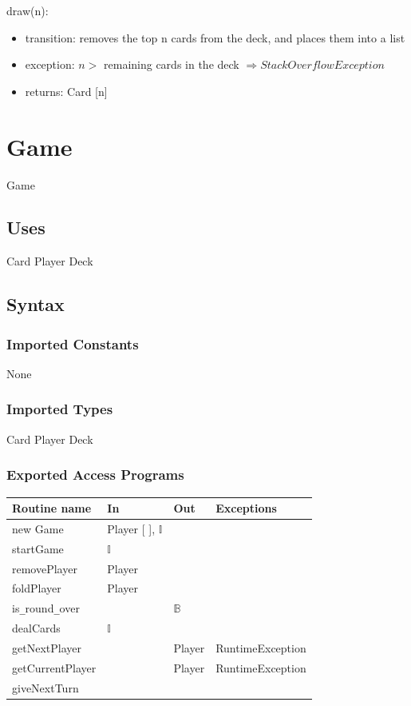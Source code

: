 \documentclass[12pt, titlepage]{article}
\begin{document}
\noindent draw(n):
\begin{itemize}
\item transition: removes the top n cards from the deck, and places them into a list 
\item exception: $n >$ remaining cards in the deck $\Longrightarrow StackOverflowException$
\item returns: Card [n] 
\end{itemize}

\section*{Game}

Game

\subsection* {Uses}

Card
Player
Deck

\subsection* {Syntax}

\subsubsection* {Imported Constants}

None

\subsubsection* {Imported Types}

Card
Player 
Deck

\subsubsection* {Exported Access Programs}

\begin{tabular}{| l | l | l | p{5cm} |}
\hline
\textbf{Routine name} & \textbf{In} & \textbf{Out} & \textbf{Exceptions}\\
\hline
new Game & Player [ ], $\mathbb{I}$ & &\\
\hline
startGame & $\mathbb{I}$ & &\\
\hline 
removePlayer & Player & &\\
\hline 
foldPlayer & Player & &\\
\hline 
is\verb|_|round\verb|_|over & & $\mathbb{B}$ &\\
\hline 
dealCards & $\mathbb{I}$ & &\\
\hline
getNextPlayer & & Player & RuntimeException\\ 
\hline 
getCurrentPlayer & & Player & RuntimeException\\
\hline 
giveNextTurn & & &\\
\hline
\end{tabular}
\end{document}
